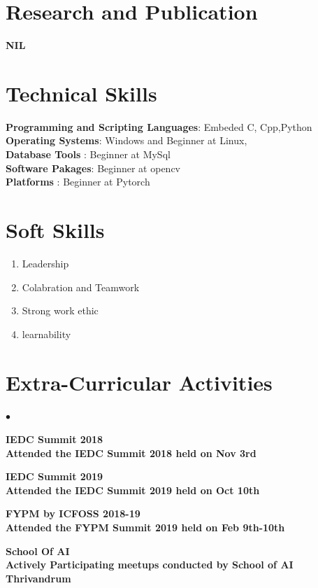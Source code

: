 \documentclass[margin,line]{res}
\newenvironment{list2}{
	\begin{list}{$\bullet$}{%
			\setlength{\itemsep}{0in}
			\setlength{\parsep}{0in} \setlength{\parskip}{0in}
			\setlength{\topsep}{0in} \setlength{\partopsep}{0in}
			\setlength{\leftmargin}{0.2in}}}{\end{list}}
\begin{document}
\begin{resume}
\section{\sc Research and Publication}

\bf NIL
\vspace{.1in}
\section{\sc Technical Skills}
{\bf Programming and Scripting Languages}: Embeded C, Cpp,Python \\
{\bf Operating Systems}: Windows and Beginner at Linux,\\
{\bf Database Tools}  :  Beginner at MySql\\
{\bf Software Pakages}:  Beginner at opencv\\
{\bf Platforms}       : Beginner at Pytorch
\section{\sc Soft Skills}
\begin{enumerate} %
	\item Leadership 
	\item Colabration and Teamwork
	\item Strong work ethic 
	\item learnability 
\end{enumerate}

\section{\sc Extra-Curricular Activities}
\begin{list2} %
	\item \bf IEDC Summit 2018 \\
	Attended  the IEDC Summit 2018 held on Nov 3rd \\
	\item \bf IEDC Summit 2019 \\
	Attended  the IEDC Summit 2019 held on Oct 10th \\
	\item \bf FYPM by ICFOSS 2018-19\\
	Attended the FYPM Summit 2019 held on Feb 9th-10th 
	\item \bf School Of AI  \\
	Actively Participating meetups conducted by School of AI Thrivandrum
	

\end{list2}
\end{resume}
\end{document}

